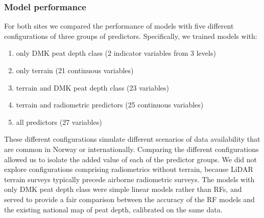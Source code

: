 \documentclass[soil, manuscript]{copernicus}
\providecommand{\tightlist}{%
  \setlength{\itemsep}{0pt}\setlength{\parskip}{0pt}}
\begin{document}
\subsubsection{Model performance}

For both sites we compared the performance of models with five different configurations of three groups of predictors.
Specifically, we trained models with:

\begin{enumerate}
\def\labelenumi{\arabic{enumi}.}
\tightlist
\item
  only DMK peat depth class (2 indicator variables from 3 levels)
\item
  only terrain (21 continuous variables)
\item
  terrain and DMK peat depth class (23 variables)
\item
  terrain and radiometric predictors (25 continuous variables)
\item
  all predictors (27 variables)
\end{enumerate}

These different configurations simulate different scenarios of data availability that are common in Norway or internationally.
Comparing the different configurations allowed us to isolate the added value of each of the predictor groups.
We did not explore configurations comprising radiometrics without terrain, because LiDAR terrain surveys typically precede airborne radiometric surveys.
The models with only DMK peat depth class were simple linear models rather than RFs, and served to provide a fair comparison between the accuracy of the RF models and the existing national map of peat depth, calibrated on the same data.
\end{document}
